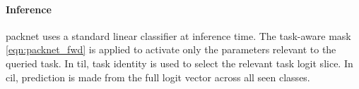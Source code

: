 \paragraph{Inference}

\gls{packnet} uses a standard linear classifier at inference time. The task-aware
mask \eqref{eqn:packnet_fwd} is applied to activate only the parameters relevant
to the queried task. In \gls{til}, task identity is used to select the relevant
task logit slice. In \gls{cil}, prediction is made from the full logit vector
across all seen classes.
